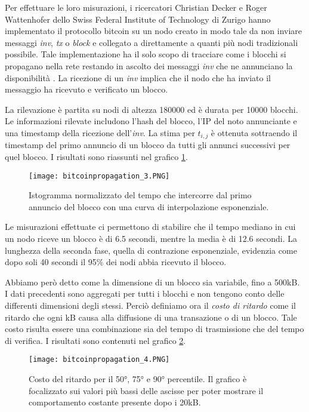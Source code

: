 Per effettuare le loro misurazioni, i ricercatori Christian Decker e Roger Wattenhofer dello Swiss Federal Institute of Technology di Zurigo hanno implementato il protocollo bitcoin su un nodo creato in modo tale da non inviare messaggi \emph{inv}, \emph{tx} o \emph{block} e collegato a direttamente a quanti più nodi tradizionali possibile. Tale implementazione ha il solo scopo di tracciare come i blocchi si propagano nella rete restando in ascolto dei messaggi \emph{inv} che ne annunciano la disponibilità \cite{bitcoinpropagation}. La ricezione di un \emph{inv} implica che il nodo che ha inviato il messaggio ha ricevuto e verificato un blocco.

La rilevazione è partita su nodi di altezza 180000 ed è durata per 10000 blocchi. Le informazioni rilevate includono l'hash del blocco, l'IP del noto annunciante e una timestamp della ricezione dell'\emph{inv}. La stima per $t_{i,j}$ è ottenuta sottraendo il timestamp del primo annuncio di un blocco da tutti gli annunci successivi per quel blocco. I risultati sono riassunti nel grafico \ref{bitcoinpropagation_3}.

\begin{figure}[htbp]
\centering
\texttt{[image: bitcoinpropagation\_3.PNG]}
\caption{Istogramma normalizzato del tempo che intercorre dal primo annuncio del blocco con una curva di interpolazione esponenziale.\label{bitcoinpropagation_3}}
\end{figure}

Le misurazioni effettuate ci permettono di stabilire che il tempo mediano in cui un nodo riceve un blocco è di 6.5 secondi, mentre la media è di 12.6 secondi. La lunghezza della seconda fase, quella di contrazione esponenziale, evidenzia come dopo soli 40 secondi il 95\% dei nodi abbia ricevuto il blocco.

Abbiamo però detto come la dimensione di un blocco sia variabile, fino a 500kB. I dati precedenti sono aggregati per tutti i blocchi e non tengono conto delle differenti dimensioni degli stessi. Perciò definiamo ora il \emph{costo di ritardo} come il ritardo che ogni kB causa alla diffusione di una transazione o di un blocco. Tale costo risulta essere una combinazione sia del tempo di trasmissione che del tempo di verifica. I risultati sono contenuti nel grafico \ref{bitcoinpropagation_4}.

\begin{figure}[htbp]
\centering
\texttt{[image: bitcoinpropagation\_4.PNG]}
\caption{Costo del ritardo per il 50°, 75° e 90° percentile. Il grafico è focalizzato sui valori più bassi delle ascisse per poter mostrare il comportamento costante presente dopo i 20kB.\label{bitcoinpropagation_4}}
\end{figure}

